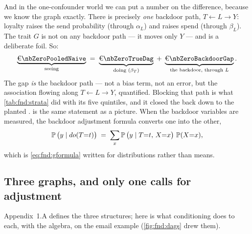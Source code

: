 And in the one-confounder world we can put a number on the difference, because we know the
graph exactly. There is precisely \emph{one} backdoor path, $T \leftarrow L \rightarrow Y$:
loyalty raises the send probability (through $\alpha_L$) and raises spend (through $\beta_L$).
The trait $G$ is not on any backdoor path --- it moves only $Y$ --- and is a deliberate foil.
So:
%
\[
  \underbrace{\eur{\nbZeroPooledNaive}}_{\text{seeing}}
  \;=\; \underbrace{\eur{\nbZeroTrueDag}}_{\text{doing } (\beta_T)}
  \;+\; \underbrace{\eur{\nbZeroBackdoorGap}}_{\text{the backdoor, through } L} .
\]
%
The gap \emph{is} the backdoor path --- not a bias term, not an error, but the association
flowing along $T \leftarrow L \rightarrow Y$, quantified. Blocking that path is what
\cref{tab:fnd:strata} did with its five quintiles, and it closed the \eur{\nbZeroBackdoorGap}
back down to the planted \eur{\nbZeroTrueDag}.  is the same statement
as a picture. When the backdoor variables are measured, the backdoor adjustment formula
converts one into the other,
%
\begin{equation}
  \operatorname{\mathbb{P}}\big(y \mid do(T{=}t)\big) \;=\; \sum_x \operatorname{\mathbb{P}}\big(y \mid T{=}t,\, X{=}x\big)\, \operatorname{\mathbb{P}}(X{=}x),
  \label{eq:fnd:backdoor}
\end{equation}
%
which is \cref{eq:fnd:gformula} written for distributions rather than means.



\subsection*{Three graphs, and only one calls for adjustment}

Appendix~1.A defines the three structures; here is what conditioning does to each, with the
algebra, on the email example (\cref{fig:fnd:dags} drew them).

